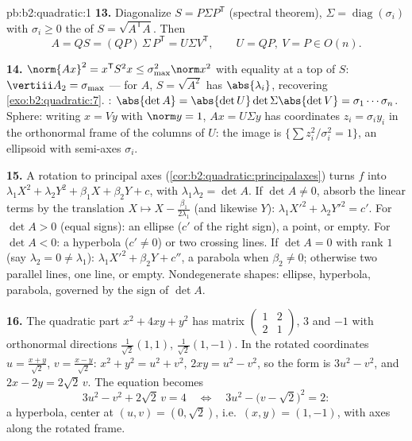 \begin{solution}{pb:b2:quadratic:1}
\textbf{13.} Diagonalize $S = P\Sigma P^{\mathsf T}$ (spectral
theorem), $\Sigma = \operatorname{diag}(\sigma_i)$ with
$\sigma_i \geq 0$ the  of $S =
\sqrt{A^{\mathsf T}A}$. Then
\[
A = QS = (QP)\,\Sigma\,P^{\mathsf T} = U\Sigma V^{\mathsf T},
\qquad U = QP,\ V = P \in O(n) .
\]

\textbf{14.} $\norm{Ax}^2 = x^{\mathsf T}S^2x \leq
\sigma_{\max}^2\norm x^2$ with equality at a top  of
$S$: $\vertiii A_2 = \sigma_{\max}$ --- for  $A$,
$S = \sqrt{A^2}$ has  $\abs{\lambda_i}$, recovering
\cref{exo:b2:quadratic:7}. : $\abs{\det A} =
\abs{\det U}\det\Sigma\abs{\det V} = \sigma_1\cdots\sigma_n$.
Sphere: writing $x = Vy$ with $\norm y = 1$, $Ax = U\Sigma y$
has coordinates $z_i = \sigma_iy_i$ in the orthonormal frame of
the columns of $U$: the image is $\{\sum z_i^2/\sigma_i^2 =
1\}$, an ellipsoid with semi-axes $\sigma_i$.

\textbf{15.} A rotation to principal axes
(\cref{cor:b2:quadratic:principalaxes}) turns $f$ into
$\lambda_1X^2 + \lambda_2Y^2 + \beta_1X + \beta_2Y + c$, with
$\lambda_1\lambda_2 = \det A$. If $\det A \neq 0$, absorb the
linear terms by the translation $X \mapsto X -
\frac{\beta_1}{2\lambda_1}$ (and likewise $Y$): $\lambda_1X'^2
+ \lambda_2Y'^2 = c'$. For $\det A > 0$ (equal signs): an
ellipse ($c'$ of the right sign), a point, or empty. For $\det
A < 0$: a hyperbola ($c' \neq 0$) or two crossing lines. If
$\det A = 0$ with rank $1$ (say $\lambda_2 = 0 \neq
\lambda_1$): $\lambda_1X'^2 + \beta_2Y + c''$, a parabola when
$\beta_2 \neq 0$; otherwise two parallel lines, one line, or
empty. Nondegenerate shapes: ellipse, hyperbola, parabola,
governed by the sign of $\det A$.

\textbf{16.} The quadratic part $x^2 + 4xy + y^2$ has matrix
$\begin{pmatrix}1 & 2\\ 2 & 1\end{pmatrix}$,  $3$
and $-1$ with orthonormal directions $\frac{1}{\sqrt2}(1,1)$,
$\frac{1}{\sqrt2}(1,-1)$. In the rotated coordinates $u =
\frac{x+y}{\sqrt2}$, $v = \frac{x-y}{\sqrt2}$: $x^2 + y^2 = u^2
+ v^2$, $2xy = u^2 - v^2$, so the form is $3u^2 - v^2$, and $2x
- 2y = 2\sqrt2\,v$. The equation becomes
\[
3u^2 - v^2 + 2\sqrt2\,v = 4
\quad\Longleftrightarrow\quad
3u^2 - \bigl(v - \sqrt2\bigr)^2 = 2 :
\]
a hyperbola, center at $(u, v) = (0, \sqrt2)$, i.e.\ $(x, y) =
(1, -1)$, with axes along the rotated frame.


\end{solution}
